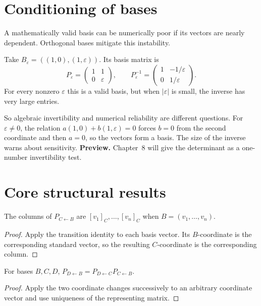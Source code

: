 \section{Conditioning of bases}
A mathematically valid basis can be numerically poor if its vectors are nearly dependent. Orthogonal bases mitigate this instability.


\begin{example}\label{ex:i04-expand-03}
Take \(B_\varepsilon=((1,0),(1,\varepsilon))\). Its basis matrix is
\[
P_\varepsilon=\begin{pmatrix}1&1\\0&\varepsilon\end{pmatrix},
\qquad
P_\varepsilon^{-1}
=\begin{pmatrix}1&-1/\varepsilon\\0&1/\varepsilon\end{pmatrix}.
\]
For every nonzero \(\varepsilon\) this is a valid basis, but when
\(|\varepsilon|\) is small, the inverse has very large entries.

So algebraic invertibility and numerical reliability are different questions.
For $\varepsilon\ne0$, the relation
$a(1,0)+b(1,\varepsilon)=0$ forces $b=0$ from the second coordinate and then
$a=0$, so the vectors form a basis. The size of the inverse warns about
sensitivity. \textbf{Preview.} Chapter~8 will give the determinant as a
one-number invertibility test.
\end{example}
\section{Core structural results}

\begin{theorem}\label{thm:i04-01}
The columns of $P_{C\leftarrow B}$ are $[v_1]_C,\ldots,[v_n]_C$ when $B=(v_1,\ldots,v_n)$.
\begin{proof}
Apply the transition identity to each basis vector. Its $B$-coordinate is the corresponding standard vector, so the resulting $C$-coordinate is the corresponding column.
\end{proof}
\end{theorem}

\begin{theorem}\label{thm:i04-02}
For bases $B,C,D$, $P_{D\leftarrow B}=P_{D\leftarrow C}P_{C\leftarrow B}$.
\begin{proof}
Apply the two coordinate changes successively to an arbitrary coordinate vector and use uniqueness of the representing matrix.
\end{proof}
\end{theorem}

